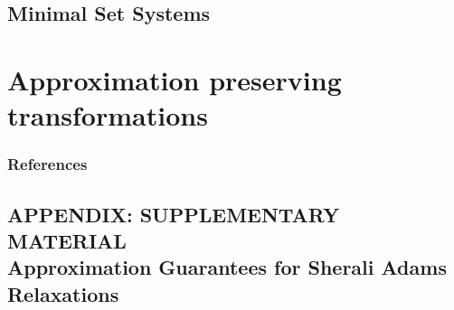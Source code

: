 \documentclass[twoside]{article}
\theoremstyle{slplain}
\theoremstyle{remark}
\theoremstyle{definition}
\begin{document}








\subsection{Minimal Set Systems}



\section{Approximation preserving transformations}









\subsubsection*{References}
\begin{footnotesize} %



\end{footnotesize} %

\clearpage
\newpage
\onecolumn
\begin{appendix}
\section{APPENDIX: SUPPLEMENTARY MATERIAL\\ Approximation Guarantees for Sherali Adams Relaxations}


\end{appendix}

%
\end{document}
